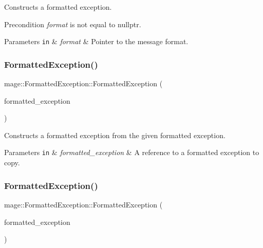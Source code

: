 Constructs a formatted exception.

\begin{DoxyPrecond}{Precondition}
{\itshape format} is not equal to {\ttfamily nullptr}. 
\end{DoxyPrecond}

\begin{DoxyParams}[1]{Parameters}
\mbox{\tt in}  & {\em format} & Pointer to the message format. \\
\hline
\end{DoxyParams}
\hypertarget{structmage_1_1_formatted_exception_afd5d6b7a9db65b127badbf498186ebe8}{}\label{structmage_1_1_formatted_exception_afd5d6b7a9db65b127badbf498186ebe8} 
\subsubsection{\texorpdfstring{Formatted\+Exception()}{FormattedException()}\hspace{0.1cm}{\footnotesize\ttfamily [3/4]}}
{\footnotesize\ttfamily mage\+::\+Formatted\+Exception\+::\+Formatted\+Exception (\begin{DoxyParamCaption}\item[{const \hyperlink{structmage_1_1_formatted_exception}{Formatted\+Exception} \&}]{formatted\+\_\+exception }\end{DoxyParamCaption})\hspace{0.3cm}{\ttfamily [default]}}

Constructs a formatted exception from the given formatted exception.


\begin{DoxyParams}[1]{Parameters}
\mbox{\tt in}  & {\em formatted\+\_\+exception} & A reference to a formatted exception to copy. \\
\hline
\end{DoxyParams}
\hypertarget{structmage_1_1_formatted_exception_ab1371b0a079fc50fcae39722e5e29cb2}{}\label{structmage_1_1_formatted_exception_ab1371b0a079fc50fcae39722e5e29cb2} 
\subsubsection{\texorpdfstring{Formatted\+Exception()}{FormattedException()}\hspace{0.1cm}{\footnotesize\ttfamily [4/4]}}
{\footnotesize\ttfamily mage\+::\+Formatted\+Exception\+::\+Formatted\+Exception (\begin{DoxyParamCaption}\item[{\hyperlink{structmage_1_1_formatted_exception}{Formatted\+Exception} \&\&}]{formatted\+\_\+exception }\end{DoxyParamCaption})\hspace{0.3cm}{\ttfamily [default]}}

